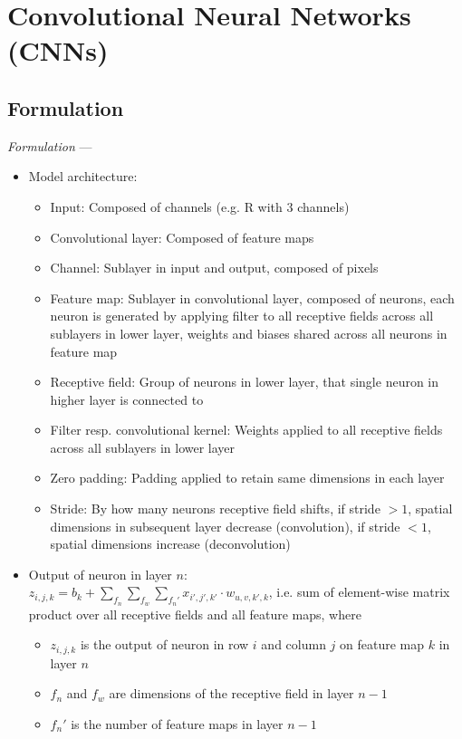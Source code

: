 \section{Convolutional Neural Networks (CNNs)}
\subsection*{Formulation}
\emph{Formulation} --- 
\begin{itemize}
    \item Model architecture: 
    \begin{itemize}
        \item Input: Composed of channels (e.g. R with 3 channels)
        \item Convolutional layer: Composed of feature maps
        \item Channel: Sublayer in input and output, composed of pixels
        \item Feature map: Sublayer in convolutional layer, composed of neurons, each neuron is generated by applying filter to all receptive fields across all sublayers in lower layer, weights and biases shared across all neurons in feature map
        \item Receptive field: Group of neurons in lower layer, that single neuron in higher layer is connected to 
        \item Filter resp. convolutional kernel: Weights applied to all receptive fields across all sublayers in lower layer
        \item Zero padding: Padding applied to retain same dimensions in each layer
        \item Stride: By how many neurons receptive field shifts, if stride $> 1$, spatial dimensions in subsequent layer decrease (convolution), if stride $< 1$, spatial dimensions increase (deconvolution)
    \end{itemize}
    \item Output of neuron in layer $n$: \\
    $z_{i,j,k} = b_k + \sum_{f_n} \sum_{f_w} \sum_{f_n'} x_{i',j',k'} \cdot w_{u,v,k',k}$, i.e. sum of element-wise matrix product over all receptive fields and all feature maps, where
    \begin{itemize}
        \item $z_{i,j,k}$ is the output of neuron in row $i$ and column $j$ on feature map $k$ in layer $n$
        \item $f_n$ and $f_w$ are dimensions of the receptive field in layer $n-1$
        \item $f_n'$ is the number of feature maps in layer $n-1$

\end{itemize}
\end{itemize}
